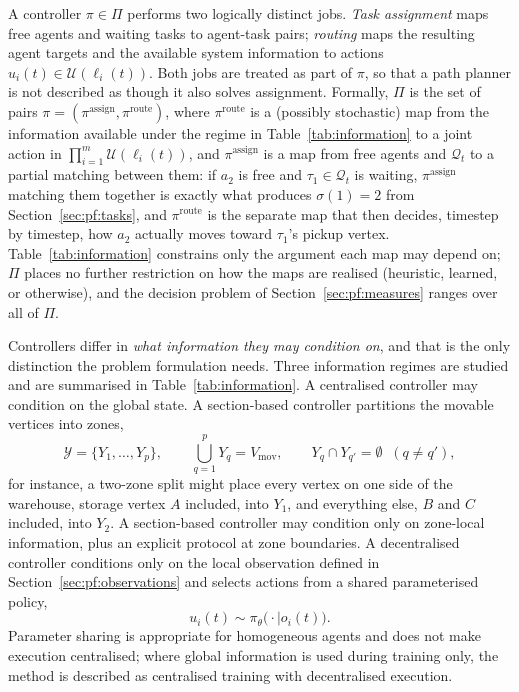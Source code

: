 \documentclass[../main.tex]{subfiles}
\begin{document}
A controller $\pi \in \Pi$ performs two logically distinct jobs. \emph{Task
assignment} maps free agents and waiting tasks to agent-task pairs; \emph{routing}
maps the resulting agent targets and the available system information to actions
$u_i(t) \in \mathcal{U}(\ell_i(t))$. Both jobs are treated as part of $\pi$, so
that a path planner is not described as though it also solves assignment.
Formally, $\Pi$ is the set of pairs %
$\pi = (\pi^{\mathrm{assign}}, \pi^{\mathrm{route}})$, where
$\pi^{\mathrm{route}}$ is a (possibly stochastic) map from the information
available under the regime in Table~\ref{tab:information} to a joint action in
$\prod_{i=1}^m \mathcal{U}(\ell_i(t))$, and $\pi^{\mathrm{assign}}$ is a map from
free agents and $\mathcal{Q}_t$ to a partial matching between them: if $a_2$
is free and $\tau_1 \in \mathcal{Q}_t$ is waiting, $\pi^{\mathrm{assign}}$
matching them together is exactly what produces $\sigma(1)=2$ from
Section~\ref{sec:pf:tasks}, and $\pi^{\mathrm{route}}$ is the separate map
that then decides, timestep by timestep, how $a_2$ actually moves toward
$\tau_1$'s pickup vertex.
Table~\ref{tab:information} constrains only the argument each map may depend on;
$\Pi$ places no further restriction on how the maps are realised (heuristic,
learned, or otherwise), and the decision problem of
Section~\ref{sec:pf:measures} ranges over all of $\Pi$.

Controllers differ in \emph{what information they may condition on}, and that is
the only distinction the problem formulation needs. Three information regimes are
studied and are summarised in Table~\ref{tab:information}. A centralised
controller may condition on the global state. A section-based controller
partitions the movable vertices into zones,
\begin{equation}
  \mathcal{Y} = \{Y_1,\dots,Y_p\}, \qquad
  \bigcup_{q=1}^{p} Y_q = V_{\mathrm{mov}}, \qquad
  Y_q \cap Y_{q'} = \emptyset \;\; (q \neq q'),
  \label{eq:partition}
\end{equation}
for instance, a two-zone split might place every vertex on one side of the
warehouse, storage vertex $A$ included, into $Y_1$, and everything else,
$B$ and $C$ included, into $Y_2$. A section-based controller
may condition only on zone-local information, plus an explicit protocol at
zone boundaries. A decentralised controller conditions only on the local
observation defined in Section~\ref{sec:pf:observations} and selects actions from
a shared parameterised policy,
\[
  u_i(t) \sim \pi_\theta\bigl(\cdot \mid o_i(t)\bigr).
\]
Parameter sharing is appropriate for homogeneous agents and does not make
execution centralised; where global information is used during training only, the
method is described as centralised training with decentralised execution.
\end{document}
